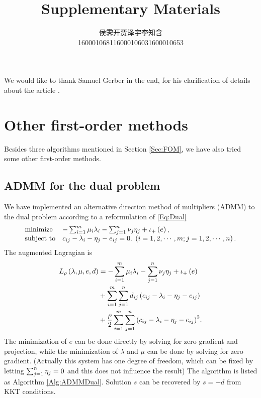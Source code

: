 \documentclass[english]{pkupaper}
\begin{document}
We would like to thank Samuel Gerber in the end, for his clarification of details about the article \parencite{Gerber2017}.

\printbibliography

\newpage
\cleanthanks

\DeclareRobustCommand{\authorthing}{%
\begin{tabular}{ccc}%
侯霁开 & 贾泽宇 & 李知含\\%
1600010681 & 1600010603 & 1600010653%
\end{tabular}%
}
\title{Supplementary Materials}
\author{\authorthing}

\maketitle

\section{Other first-order methods}

Besides three algorithms mentioned in Section \ref{Sec:FOM}, we have also tried some other first-order methods.

\subsection{ADMM for the dual problem}

We have implemented an alternative direction method of multipliers (ADMM) to the dual problem according to a reformulation of \eqref{Eq:Dual}
\begin{equation}
\begin{array}{ll}
\mathrel{\text{{minimize}}} & -\sum_{ {i} = {1} }^{m}{ \mu_i \lambda_i } - \sum_{ {j} = {1} }^{n}{ \nu_j \eta_j } + \iota_+ \left( e \right), \\
\mathrel{\text{{subject to}}} & c_{ i j } - \lambda_i - \eta_j - e_{ i j } = 0. \mathbin{}\left(  i = 1, 2, \cdots, m; j = 1, 2, \cdots, n  \right).
\end{array}
\end{equation}
The augmented Lagragian is
\begin{equation}
\begin{aligned}
L_{\rho} \left(  \lambda, \mu, e, d  \right) &= -\sum_{ {i} = {1} }^{m}{ \mu_i \lambda_i } - \sum_{ {j} = {1} }^{n}{ \nu_j \eta_j } + \iota_+ \left( e \right) \\
&+ \sum_{ {i} = {1} }^{m}{\sum_{ {j} = {1} }^{n}{ d_{ i j } \left(  c_{ i j } - \lambda_i - \eta_j - e_{ i j }  \right) }} \\
&+ \frac{\rho}{2} \sum_{ {i} = {1} }^{m}{\sum_{ {j} = {1} }^{n}{\left(  c_{ i j } - \lambda_i - \eta_j - e_{ i j }  \right)^2}}.
\end{aligned}
\end{equation}
The minimization of $e$ can be done directly by solving for zero gradient and projection, while the minimization of $\lambda$ and $\mu$ can be done by solving for zero gradient. (Actually this system has one degree of freedom, which can be fixed by letting $ \sum_{ {j} = {1} }^{n}{\eta_j} = 0 $ and this does not influence the result)  The algorithm is listed as Algorithm \ref{Alg:ADMMDual}. Solution $s$ can be recovered by $ s = -d $ from KKT conditions.
\end{document}
